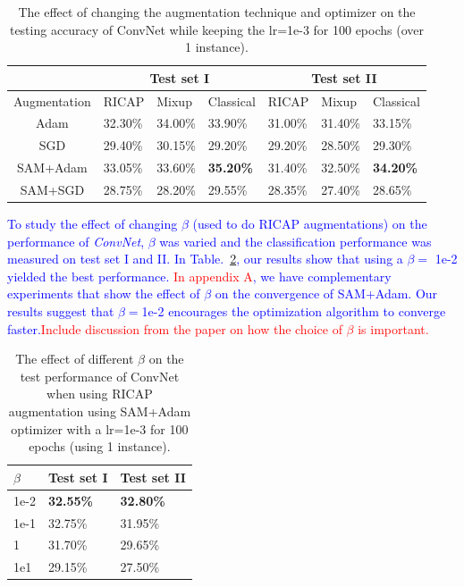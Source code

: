 \documentclass[a4paper,11pt]{article}
\begin{document}
\begin{table}[h!]

\begin{center}
\caption{The effect of changing the augmentation technique and optimizer on the testing accuracy of ConvNet while keeping the lr=1e-3 for 100 epochs (over 1 instance).}
\begin{tabular}{|c|l|l|l|l|l|l|}
\hline
                          & \multicolumn{3}{c|}{Test set I}      & \multicolumn{3}{c|}{Test set II}     \\ \hline
\multicolumn{1}{|l|}{Augmentation} & RICAP   & Mixup   & Classical        & RICAP   & Mixup   & Classical        \\ \hline
Adam                               & 32.30\% & 34.00\% & 33.90\%          & 31.00\% & 31.40\% & 33.15\%          \\
SGD                                & 29.40\% & 30.15\% & 29.20\%          & 29.20\% & 28.50\% & 29.30\%          \\
SAM+Adam                           & 33.05\% & 33.60\% & \textbf{35.20\%} & 31.40\% & 32.50\% & \textbf{34.20\%} \\
SAM+SGD                            & 28.75\% & 28.20\% & 29.55\%          & 28.35\% & 27.40\% & 28.65\%          \\ \hline
\end{tabular}
\end{center}
\label{Table:convnet_optimizer_aug}
\end{table}
\textcolor{blue}{To study the effect of changing $\beta$ (used to do RICAP augmentations) on the performance of \textit{ConvNet}, $\beta$ was varied and the classification performance was measured on test set I and II. In Table.~\ref{table:convnet_beta}, our results show that using a $\beta=$ 1e-2 yielded the best performance. \textcolor{red}{In appendix A}, we have complementary experiments that show the effect of $\beta$ on the convergence of SAM+Adam. Our results suggest that $\beta=$1e-2 encourages the optimization algorithm to converge faster.}\textcolor{red}{Include discussion from the paper on how the choice of $\beta$ is important.}
\begin{table}[h!]
\caption{The effect of different $\beta$ on the test performance of ConvNet when using RICAP augmentation using SAM+Adam optimizer with a lr=1e-3 for 100 epochs (using 1 instance).}
\begin{center}
\begin{tabular}{|l|l|l|}
\hline
$\beta$ & Test set I & Test set II \\ \hline
1e-2    & \textbf{32.55\%}    & \textbf{32.80\%}     \\
1e-1    & 32.75\%    & 31.95\%     \\
1       & 31.70\%    & 29.65\%     \\
1e1     & 29.15\%    & 27.50\%     \\ \hline
\end{tabular}
\end{center}
\label{table:convnet_beta}
\end{table}
\end{document}
